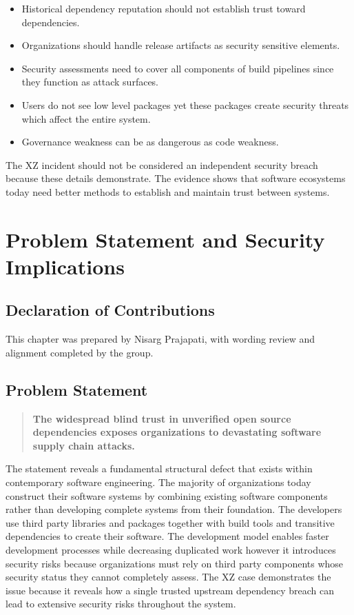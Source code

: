 \begin{itemize}
    \item Historical dependency reputation should not establish trust toward dependencies.
    \item Organizations should handle release artifacts as security sensitive elements.
    \item Security assessments need to cover all components of build pipelines since they function as attack surfaces.
    \item Users do not see low level packages yet these packages create security threats which affect the entire system.
    \item Governance weakness can be as dangerous as code weakness.
\end{itemize}

The XZ incident should not be considered an independent security breach because these details demonstrate. The evidence shows that software ecosystems today need better methods to establish and maintain trust between systems.

\chapter{Problem Statement and Security Implications}
\label{ch:problem}

\section*{Declaration of Contributions}
This chapter was prepared by Nisarg Prajapati, with wording review and alignment completed by the group.

\section{Problem Statement}

\begin{quote}
\textbf{The widespread blind trust in unverified open source dependencies exposes organizations to devastating software supply chain attacks.}
\end{quote}

The statement reveals a fundamental structural defect that exists within contemporary software engineering. The majority of organizations today construct their software systems by combining existing software components rather than developing complete systems from their foundation. The developers use third party libraries and packages together with build tools and transitive dependencies to create their software. The development model enables faster development processes while decreasing duplicated work however it introduces security risks because organizations must rely on third party components whose security status they cannot completely assess. The XZ case demonstrates the issue because it reveals how a single trusted upstream dependency breach can lead to extensive security risks throughout the system.


